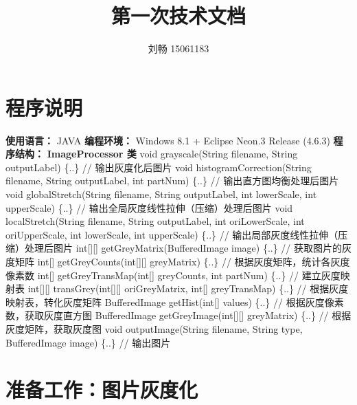 \documentclass[UTF8]{ctexart}
\title{第一次技术文档}
\author{刘畅 15061183}
\begin{document}
	\maketitle
	\section{程序说明}
	\noindent
	\textbf{使用语言：} JAVA \newline
	\textbf{编程环境：} Windows 8.1 + Eclipse Neon.3 Release (4.6.3) \newline
	\textbf{程序结构：} \newline
	\indent \textbf{ImageProcessor 类} \newline
	\indent void grayscale(String filename, String outputLabel) \{..\} // 输出灰度化后图片 \newline
	\indent void histogramCorrection(String filename, String outputLabel, int partNum) \{..\} // 输出直方图均衡处理后图片 \newline
	\indent void globalStretch(String filename, String outputLabel, int lowerScale, int upperScale) \{..\} // 输出全局灰度线性拉伸（压缩）处理后图片 \newline
	\indent void localStretch(String filename, String outputLabel, int oriLowerScale, int oriUpperScale, int lowerScale, int upperScale) \{..\} // 输出局部灰度线性拉伸（压缩）处理后图片 \newline
	\indent int[][] getGreyMatrix(BufferedImage image) \{..\} // 获取图片的灰度矩阵 \newline
	\indent int[] getGreyCounts(int[][] greyMatrix) \{..\} // 根据灰度矩阵，统计各灰度像素数 \newline
	\indent int[] getGreyTransMap(int[] greyCounts, int partNum) \{..\} // 建立灰度映射表 \newline
	\indent int[][] transGrey(int[][] oriGreyMatrix, int[] greyTransMap) \{..\} // 根据灰度映射表，转化灰度矩阵 \newline
	\indent BufferedImage getHist(int[] values) \{..\} // 根据灰度像素数，获取灰度直方图 \newline
	\indent BufferedImage getGreyImage(int[][] greyMatrix) \{..\} // 根据灰度矩阵，获取灰度图 \newline
	\indent void outputImage(String filename, String type, BufferedImage image) \{..\} // 输出图片 \newline

	\section{准备工作：图片灰度化}
\end{document}
